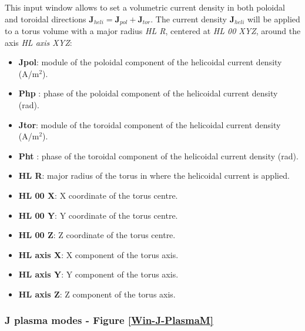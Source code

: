 This input window allows to set a volumetric current density in both poloidal and toroidal directions $\textbf{J}_{heli} = \textbf{J}_{pol} + \textbf{J}_{tor}$. The current density $\textbf{J}_{heli}$ will be applied to a torus volume with a major radius \emph{HL R}, centered at \emph{HL 00 XYZ}, around the axis \emph{HL axis XYZ}:
\begin{itemize}\itemsep0em 
	\item \textbf{Jpol}: module of the poloidal component of the helicoidal current density (A/m$^{2}$). 
	\item \textbf{Php }: phase of the poloidal component of the helicoidal current density (rad).
	\\
	\item \textbf{Jtor}: module of the toroidal component of the helicoidal current density (A/m$^{2}$). 
    \item \textbf{Pht }: phase of the toroidal component of the helicoidal current density (rad).
    \\
    \item \textbf{HL R}: major radius of the torus in where the helicoidal current is applied.
    \\
	\item \textbf{HL 00 X}: X coordinate of the torus centre.
	\item \textbf{HL 00 Y}: Y coordinate of the torus centre.
	\item \textbf{HL 00 Z}: Z coordinate of the torus centre.
	\\
	\item \textbf{HL axis X}: X component of the torus axis.
	\item \textbf{HL axis Y}: Y component of the torus axis.
	\item \textbf{HL axis Z}: Z component of the torus axis.
\end{itemize}

\subsubsection{J plasma modes - Figure \ref{Win-J-PlasmaM}}

